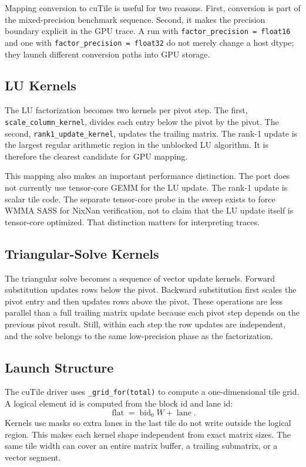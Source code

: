 \documentclass[11pt]{article}
\newcommand{\cutile}{cuTile}
\newcommand{\nixnan}{NixNan}
\newcommand{\code}[1]{\texttt{#1}}
\begin{document}
Mapping conversion to \cutile{} is useful for two reasons. First, conversion is
part of the mixed-precision benchmark sequence. Second, it makes the precision
boundary explicit in the GPU trace. A run with \code{factor\_precision =
float16} and one with \code{factor\_precision = float32} do not merely change
a host dtype; they launch different conversion paths into GPU storage.

\subsection{LU Kernels}

The LU factorization becomes two kernels per pivot step. The first,
\code{scale\_column\_kernel}, divides each entry below the pivot by the pivot.
The second, \code{rank1\_update\_kernel}, updates the trailing matrix. The
rank-1 update is the largest regular arithmetic region in the unblocked LU
algorithm. It is therefore the clearest candidate for GPU mapping.

This mapping also makes an important performance distinction. The port does
not currently use tensor-core GEMM for the LU update. The rank-1 update is
scalar tile code. The separate tensor-core probe in the sweep exists to force
WMMA SASS for \nixnan{} verification, not to claim that the LU update itself
is tensor-core optimized. That distinction matters for interpreting traces.

\subsection{Triangular-Solve Kernels}

The triangular solve becomes a sequence of vector update kernels. Forward
substitution updates rows below the pivot. Backward substitution first scales
the pivot entry and then updates rows above the pivot. These operations are
less parallel than a full trailing matrix update because each pivot step
depends on the previous pivot result. Still, within each step the row updates
are independent, and the solve belongs to the same low-precision phase as the
factorization.

\subsection{Launch Structure}

The \cutile{} driver uses \code{\_grid\_for(total)} to compute a one-dimensional
tile grid. A logical element id is computed from the block id and lane id:
\[
  \operatorname{flat} = \operatorname{bid}_0 W + \operatorname{lane}.
\]
Kernels use masks so extra lanes in the last tile do not write outside the
logical region. This makes each kernel shape independent from exact matrix
sizes. The same tile width can cover an entire matrix buffer, a trailing
submatrix, or a vector segment.
\end{document}
